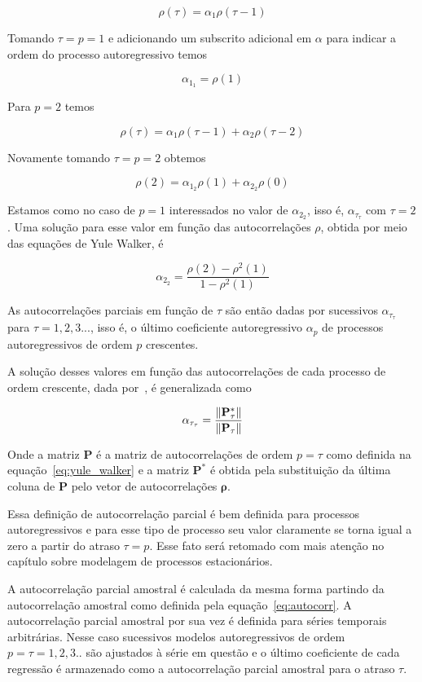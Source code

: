 $$ \rho(\tau) = \alpha_1 \rho(\tau - 1) $$

Tomando $\tau = p = 1$ e adicionando um subscrito adicional em $\alpha$ para
indicar a ordem do processo autoregressivo temos

$$ \alpha_{1_{1}} = \rho(1) $$

Para $p=2$ temos

$$ \rho(\tau) = \alpha_1 \rho(\tau - 1) + \alpha_2 \rho(\tau - 2) $$

Novamente tomando $\tau = p = 2$ obtemos

$$ \rho(2) = \alpha_{1_{2}} \rho(1) + \alpha_{2_{2}} \rho(0) $$

Estamos como no caso de $p=1$ interessados no valor de $\alpha_{2_{2}}$, isso é,
$\alpha_{\tau_{\tau}}$ com $\tau=2$. Uma solução para esse valor em função
das autocorrelações $\rho$, obtida por meio das equações de Yule Walker, é

$$ \alpha_{2_{2}} = \frac{\rho(2) - \rho^2(1)}{1 - \rho^2(1)} $$

As autocorrelações parciais em função de $\tau$ são então dadas por sucessivos
$\alpha_{\tau_{\tau}}$ para $\tau = 1, 2, 3 ...$, isso é, o último coeficiente
autoregressivo $\alpha_p$ de processos autoregressivos de ordem $p$ crescentes.

A solução desses valores em função das autocorrelações de cada processo de
ordem crescente, dada por~\cite{balba}, é generalizada como

$$ \alpha_{\tau_{\tau}} = \frac{\lVert\mathbf{P}^*_{\tau}\rVert}{\lVert\mathbf{P}_{\tau}\rVert} $$

Onde a matriz $\mathbf{\mathbf{P}}$ é a matriz de autocorrelações de ordem $p =
\tau$ como definida na equação~\ref{eq:yule_walker} e a matriz
$\mathbf{P}^*$ é obtida pela substituição da última coluna de
$\mathbf{P}$ pelo vetor de autocorrelações $\mathbf{\rho}$.

Essa definição de autocorrelação parcial é bem definida para processos
autoregressivos e para esse tipo de processo seu valor claramente se torna
igual a zero a partir do atraso $\tau = p$. Esse fato será retomado com mais
atenção no capítulo sobre modelagem de processos estacionários.

A autocorrelação parcial amostral é calculada da mesma forma partindo da
autocorrelação amostral como definida pela equação~\ref{eq:autocorr}. A
autocorrelação parcial amostral por sua vez é definida para séries temporais
arbitrárias. Nesse caso sucessivos modelos autoregressivos de ordem $p = \tau =
1, 2, 3..$ são ajustados à série em questão e o último coeficiente
de cada regressão é armazenado como a autocorrelação parcial amostral para o
atraso $\tau$.

